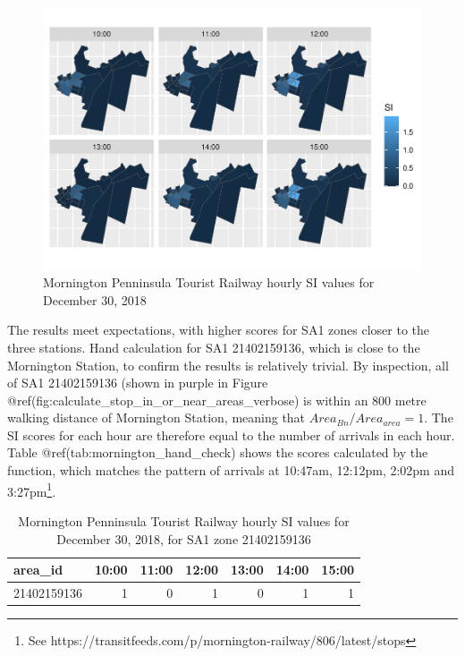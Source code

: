 \documentclass[preprint, 3p,
authoryear]{elsarticle} %
\begin{document}
\begin{figure}
\centering
\includegraphics{Leveraging_GTFS_to_assess_transit_supply_Transport_Geography_files/figure-latex/SI_mornington_20181230_output-1.pdf}
\caption{Mornington Penninsula Tourist Railway hourly SI values for
December 30, 2018}
\end{figure}

The results meet expectations, with higher scores for SA1 zones closer
to the three stations. Hand calculation for SA1 21402159136, which is
close to the Mornington Station, to confirm the results is relatively
trivial. By inspection, all of SA1 21402159136 (shown in purple in
Figure @ref(fig:calculate\_stop\_in\_or\_near\_areas\_verbose) is within
an 800 metre walking distance of Mornington Station, meaning that
\(Area_{Bn} / Area_{area} = 1\). The SI scores for each hour are
therefore equal to the number of arrivals in each hour. Table
@ref(tab:mornington\_hand\_check) shows the scores calculated by the
function, which matches the pattern of arrivals at 10:47am, 12:12pm,
2:02pm and 3:27pm\footnote{See
  https://transitfeeds.com/p/mornington-railway/806/latest/stops}.

\begin{table}

\caption{\label{tab:mornington_hand_check}Mornington Penninsula Tourist Railway hourly SI values for December 30, 2018, for SA1 zone 21402159136}
\centering
\begin{tabular}[t]{l|r|r|r|r|r|r}
\hline
area\_id & 10:00 & 11:00 & 12:00 & 13:00 & 14:00 & 15:00\\
\hline
21402159136 & 1 & 0 & 1 & 0 & 1 & 1\\
\hline
\end{tabular}
\end{table}
\end{document}
